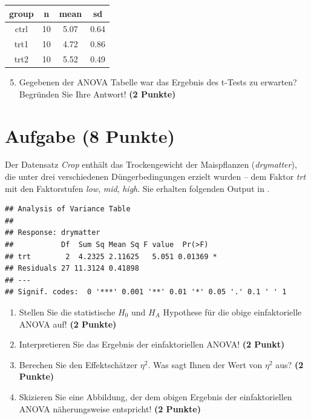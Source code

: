 \documentclass[a4paper, 10pt]{scrartcl}\usepackage[]{graphicx}\usepackage[]{xcolor}
\makeatletter
\newenvironment{kframe}{%
 \def\at@end@of@kframe{}%
 \ifinner\ifhmode%
  \def\at@end@of@kframe{\end{minipage}}%
  \begin{minipage}{\columnwidth}%
 \fi\fi%
 \def\FrameCommand##1{\hskip\@totalleftmargin \hskip-\fboxsep
 \colorbox{shadecolor}{##1}\hskip-\fboxsep
     \hskip-\linewidth \hskip-\@totalleftmargin \hskip\columnwidth}%
 \MakeFramed {\advance\hsize-\width
   \@totalleftmargin\z@ \linewidth\hsize
   \@setminipage}}%
 {\par\unskip\endMakeFramed%
 \at@end@of@kframe}
\newenvironment{knitrout}{}{} %
\makeatother
\begin{document}
\begin{knitrout}
\color{fgcolor}\begin{table}[!h]
\centering
\begin{tabular}{cccc}
\toprule
group & n & mean & sd\\
\midrule
ctrl & 10 & 5.07 & 0.64\\
trt1 & 10 & 4.72 & 0.86\\
trt2 & 10 & 5.52 & 0.49\\
\bottomrule
\end{tabular}
\end{table}

\end{knitrout}

\begin{enumerate}
  \setcounter{enumi}{4}
\item Gegebenen der ANOVA Tabelle war das Ergebnis des t-Tests zu erwarten?
  Begr{\"u}nden Sie Ihre Antwort! \textbf{(2 Punkte)}
\end{enumerate}

 
\clearpage

\section{Aufgabe \hfill (8 Punkte)}


Der Datensatz \textit{Crop} enth{\"a}lt das Trockengewicht der
Maispflanzen (\textit{drymatter}), die unter drei 
verschiedenen D{\"u}ngerbedingungen erzielt wurden -- dem Faktor
\textit{trt} mit den Faktorstufen \textit{low}, \textit{mid},
\textit{high}. Sie erhalten folgenden Output in \Rlogo.

\begin{knitrout}
\color{fgcolor}\begin{kframe}
\begin{verbatim}
## Analysis of Variance Table
## 
## Response: drymatter
##           Df  Sum Sq Mean Sq F value  Pr(>F)  
## trt        2  4.2325 2.11625   5.051 0.01369 *
## Residuals 27 11.3124 0.41898                  
## ---
## Signif. codes:  0 '***' 0.001 '**' 0.01 '*' 0.05 '.' 0.1 ' ' 1
\end{verbatim}
\end{kframe}
\end{knitrout}

\begin{enumerate}
\item Stellen Sie die statistische $H_0$ und $H_A$ Hypothese f{\"u}r die obige
  einfaktorielle ANOVA auf! \textbf{(2 Punkte)}
\item Interpretieren Sie das Ergebnis der einfaktoriellen ANOVA! \textbf{(2 Punkt)} 
\item Berechen Sie den Effektsch{\"a}tzer $\eta^2$. Was sagt Ihnen der Wert von
  $\eta^2$ aus? \textbf{(2 Punkte)}
\item Skizieren Sie eine Abbildung, der dem obigen Ergebnis der
  einfaktoriellen ANOVA n{\"a}herungsweise entspricht! \textbf{(2 Punkte)}
\end{enumerate}
\end{document}
